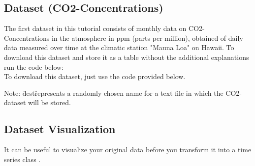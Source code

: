 \documentclass[10pt, a4paper]{article} %
\begin{document}
\subsection{Dataset (CO2-Concentrations)}%
The first dataset in this tutorial consists of monthly data on CO2- Concentrations in the atmosphere in ppm (parts per million),  obtained of daily data measured over time at the climatic station "Mauna Loa" on Hawaii. To download this dataset and store it as a table without the additional explanations run the code below: 
\\
To download this dataset, just use the code provided below.
\begin{Schunk}
\end{Schunk}
\noindent Note: \"dest\" represents a randomly chosen name for a text file in which the CO2- dataset will be stored. \\

\subsection{Dataset Visualization}
It can be useful to visualize your original data before you transform it into a time series class . 
\end{document}
